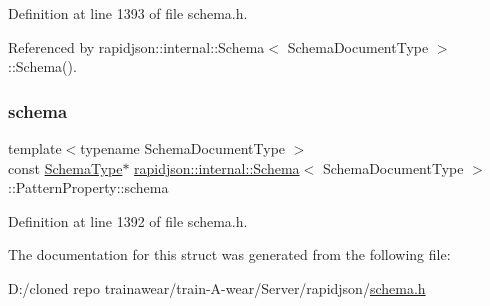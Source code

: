 Definition at line 1393 of file schema.\+h.



Referenced by rapidjson\+::internal\+::\+Schema$<$ Schema\+Document\+Type $>$\+::\+Schema().

\mbox{\label{structrapidjson_1_1internal_1_1_schema_1_1_pattern_property_aebf1636280c09538973ebfb33387d4c8}} 
\subsubsection{\texorpdfstring{schema}{schema}}
{\footnotesize\ttfamily template$<$typename Schema\+Document\+Type $>$ \\
const \mbox{\hyperlink{classrapidjson_1_1internal_1_1_schema_a62e03be17971648a9d614244ffcb0f10}{Schema\+Type}}$\ast$ \mbox{\hyperlink{classrapidjson_1_1internal_1_1_schema}{rapidjson\+::internal\+::\+Schema}}$<$ Schema\+Document\+Type $>$\+::Pattern\+Property\+::schema}



Definition at line 1392 of file schema.\+h.



The documentation for this struct was generated from the following file\+:\begin{DoxyCompactItemize}
\item 
D\+:/cloned repo trainawear/train-\/\+A-\/wear/\+Server/rapidjson/\mbox{\hyperlink{schema_8h}{schema.\+h}}\end{DoxyCompactItemize}
